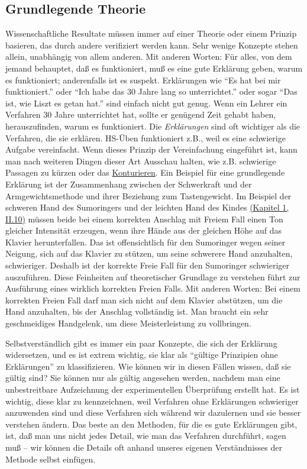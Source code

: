 \subsection{Grundlegende Theorie}
\label{c3_3f}

Wissenschaftliche Resultate müssen immer auf einer Theorie oder einem Prinzip basieren, das durch andere verifiziert werden kann.
Sehr wenige Konzepte stehen allein, unabhängig von allem anderen.
Mit anderen Worten: Für alles, von dem jemand behauptet, daß es funktioniert, muß es eine gute Erklärung geben, warum es funktioniert; anderenfalls ist es suspekt.
Erklärungen wie \enquote{Es hat bei mir funktioniert.} oder \enquote{Ich habe das 30 Jahre lang so unterrichtet.} oder sogar \enquote{Das ist, wie Liszt es getan hat.} sind einfach nicht gut genug.
Wenn ein Lehrer ein Verfahren 30 Jahre unterrichtet hat, sollte er genügend Zeit gehabt haben, herauszufinden, warum es funktioniert.
Die \textit{Erklärungen} sind oft wichtiger als die Verfahren, die sie erklären.
HS-Üben funktioniert z.B., weil es eine schwierige Aufgabe vereinfacht.
Wenn dieses Prinzip der Vereinfachung eingeführt ist, kann man nach weiteren Dingen dieser Art Ausschau halten, wie z.B. schwierige Passagen zu kürzen oder das \hyperref[c1iii8]{Konturieren}.
Ein Beispiel für eine grundlegende Erklärung ist der Zusammenhang zwischen der Schwerkraft und der Armgewichtsmethode und ihrer Beziehung zum Tastengewicht.
Im Beispiel der schweren Hand des Sumoringers und der leichten Hand des Kindes \hyperref[c1ii10]{(Kapitel 1, II.10)} müssen beide bei einem korrekten Anschlag mit Freiem Fall einen Ton gleicher Intensität erzeugen, wenn ihre Hände aus der gleichen Höhe auf das Klavier herunterfallen.
Das ist offensichtlich  für den Sumoringer wegen seiner Neigung, sich auf das Klavier zu stützen, um seine schwerere Hand anzuhalten, schwieriger.
Deshalb ist der korrekte Freie Fall für den Sumoringer schwieriger auszuführen.
Diese Feinheiten auf theoretischer Grundlage zu verstehen führt zur Ausführung eines wirklich korrekten Freien Falls.
Mit anderen Worten: Bei einem korrekten Freien Fall darf man sich nicht auf dem Klavier abstützen, um die Hand anzuhalten, bis der Anschlag vollständig ist.
Man braucht ein sehr geschmeidiges Handgelenk, um diese Meisterleistung zu vollbringen.

Selbstverständlich gibt es immer ein paar Konzepte, die sich der Erklärung widersetzen, und es ist extrem wichtig, sie klar als \enquote{gültige Prinzipien ohne Erklärungen} zu klassifizieren.
Wie können wir in diesen Fällen wissen, daß sie gültig sind?
Sie können nur als gültig angesehen werden, nachdem man eine unbestreitbare Aufzeichnung der experimentellen Überprüfung erstellt hat.
Es ist wichtig, diese klar zu kennzeichnen, weil Verfahren ohne Erklärungen schwieriger anzuwenden sind und diese Verfahren sich während wir dazulernen und sie besser verstehen ändern.
Das beste an den Methoden, für die es gute Erklärungen gibt, ist, daß man uns nicht jedes Detail, wie man das Verfahren durchführt, sagen muß -- wir können die Details oft anhand unseres eigenen Verständnisses der Methode selbst einfügen.

